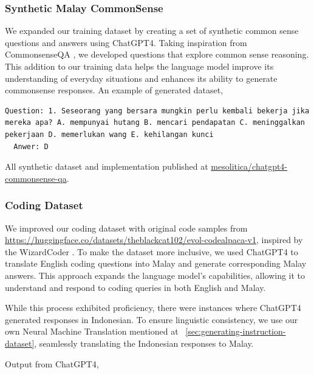 \documentclass[preprint]{article}
\begin{document}
\subsubsection{Synthetic Malay CommonSense}

We expanded our training dataset by creating a set of synthetic common sense questions and answers using ChatGPT4. Taking inspiration from CommonsenseQA \cite{talmor2019commonsenseqa}, we developed questions that explore common sense reasoning. This addition to our training data helps the language model improve its understanding of everyday situations and enhances its ability to generate commonsense responses. An example of generated dataset,

\begin{lstlisting}[breaklines=true]
  Question: 1. Seseorang yang bersara mungkin perlu kembali bekerja jika mereka apa? A. mempunyai hutang B. mencari pendapatan C. meninggalkan pekerjaan D. memerlukan wang E. kehilangan kunci
  Anwer: D
\end{lstlisting}

All synthetic dataset and implementation published at \href{https://huggingface.co/datasets/mesolitica/chatgpt4-commonsense-qa}{mesolitica/chatgpt4-commonsense-qa}.



\subsubsection{Coding Dataset}

We improved our coding dataset with original code samples from \url{https://huggingface.co/datasets/theblackcat102/evol-codealpaca-v1}, inspired by the WizardCoder \cite{luo2023wizardcoder}. To make the dataset more inclusive, we used ChatGPT4 to translate English coding questions into Malay and generate corresponding Malay answers. This approach expands the language model's capabilities, allowing it to understand and respond to coding queries in both English and Malay.

While this process exhibited proficiency, there were instances where ChatGPT4 generated responses in Indonesian. To ensure linguistic consistency, we use our own Neural Machine Translation mentioned at ~\ref{sec:generating-instruction-dataset}, seamlessly translating the Indonesian responses to Malay.

Output from ChatGPT4,
\end{document}
